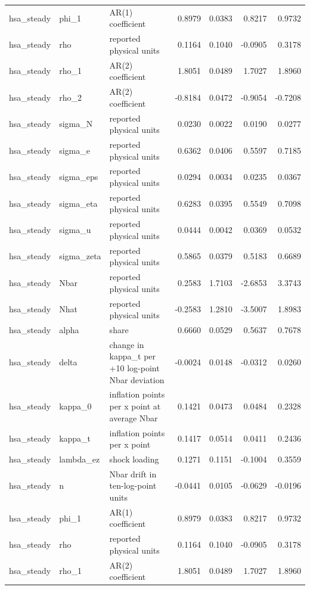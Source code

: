 \begin{tabular}{lllrrrr}
hsa\_steady & phi\_1 & AR(1) coefficient & 0.8979 & 0.0383 & 0.8217 & 0.9732 \\
hsa\_steady & rho & reported physical units & 0.1164 & 0.1040 & -0.0905 & 0.3178 \\
hsa\_steady & rho\_1 & AR(2) coefficient & 1.8051 & 0.0489 & 1.7027 & 1.8960 \\
hsa\_steady & rho\_2 & AR(2) coefficient & -0.8184 & 0.0472 & -0.9054 & -0.7208 \\
hsa\_steady & sigma\_N & reported physical units & 0.0230 & 0.0022 & 0.0190 & 0.0277 \\
hsa\_steady & sigma\_e & reported physical units & 0.6362 & 0.0406 & 0.5597 & 0.7185 \\
hsa\_steady & sigma\_eps & reported physical units & 0.0294 & 0.0034 & 0.0235 & 0.0367 \\
hsa\_steady & sigma\_eta & reported physical units & 0.6283 & 0.0395 & 0.5549 & 0.7098 \\
hsa\_steady & sigma\_u & reported physical units & 0.0444 & 0.0042 & 0.0369 & 0.0532 \\
hsa\_steady & sigma\_zeta & reported physical units & 0.5865 & 0.0379 & 0.5183 & 0.6689 \\
hsa\_steady & Nbar & reported physical units & 0.2583 & 1.7103 & -2.6853 & 3.3743 \\
hsa\_steady & Nhat & reported physical units & -0.2583 & 1.2810 & -3.5007 & 1.8983 \\
hsa\_steady & alpha & share & 0.6660 & 0.0529 & 0.5637 & 0.7678 \\
hsa\_steady & delta & change in kappa\_t per +10 log-point Nbar deviation & -0.0024 & 0.0148 & -0.0312 & 0.0260 \\
hsa\_steady & kappa\_0 & inflation points per x point at average Nbar & 0.1421 & 0.0473 & 0.0484 & 0.2328 \\
hsa\_steady & kappa\_t & inflation points per x point & 0.1417 & 0.0514 & 0.0411 & 0.2436 \\
hsa\_steady & lambda\_ez & shock loading & 0.1271 & 0.1151 & -0.1004 & 0.3559 \\
hsa\_steady & n & Nbar drift in ten-log-point units & -0.0441 & 0.0105 & -0.0629 & -0.0196 \\
hsa\_steady & phi\_1 & AR(1) coefficient & 0.8979 & 0.0383 & 0.8217 & 0.9732 \\
hsa\_steady & rho & reported physical units & 0.1164 & 0.1040 & -0.0905 & 0.3178 \\
hsa\_steady & rho\_1 & AR(2) coefficient & 1.8051 & 0.0489 & 1.7027 & 1.8960 \\

\end{tabular}
